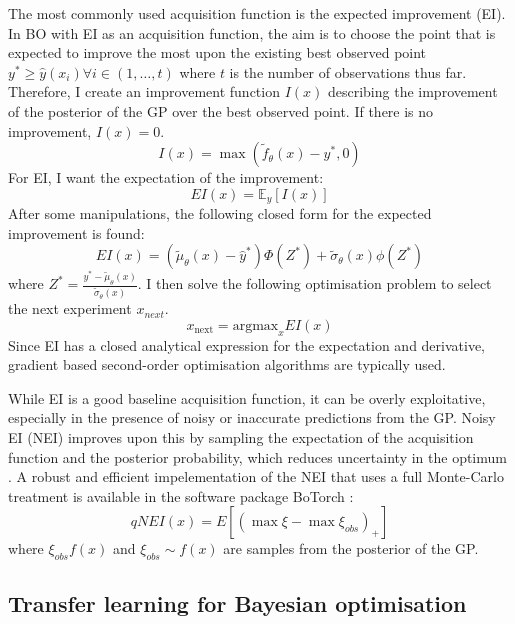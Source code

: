 The most commonly used acquisition function is the expected improvement (EI). In BO with EI as an acquisition function, the aim is to choose the point that is expected to improve the most upon the existing best observed point $y^* \geq \hat y(x_i) \forall i \in (1, \dots, t)$  where  $t$ is the number of observations thus far. Therefore, I create an improvement function $I(x)$ describing the improvement of the posterior of the GP over the best observed point. If there is no improvement, $I(x)=0$.
\begin{equation}
    I(x) = \max(\tilde f_{\theta}(x) -y^*, 0)
\end{equation}
For EI, I want the expectation of the improvement:
\begin{equation}
    EI(x) = \mathbb E_{y}[I(x)]
\end{equation}
After some manipulations, the following closed form for the expected improvement is found:
\begin{equation}
    EI(x) =(\tilde \mu_{\theta}(x)-\hat y^*)\Phi(Z^*) + \tilde \sigma_{\theta}(x) \phi(Z^*)
\end{equation}
where $Z^*= \frac{y^*-\tilde\mu_{\theta}(x)}{\tilde \sigma_{\theta}(x)}$.  I then solve the following optimisation problem to select the next experiment $x_{next}$.
\begin{equation}
    x_{\text{next}} = \text{argmax}_{x} EI(x)
\end{equation}
Since EI has a closed analytical expression for the expectation and derivative, gradient based second-order optimisation algorithms are typically used. 

While EI is a good baseline acquisition function, it can be overly exploitative, especially in the presence of noisy or inaccurate predictions from the GP.  Noisy EI (NEI) improves upon this by sampling the expectation of the acquisition function and the posterior probability, which reduces uncertainty in the optimum \cite{Letham2019}. A robust and efficient impelementation of the NEI that uses a full Monte-Carlo treatment is available in the software package BoTorch \cite{Balandat2020}:
\begin{equation}
qNEI(x)= E[(\max \xi  - \max \xi_{obs} )_+]
\end{equation}
where $\xi_{obs} f(x)$ and $\xi_{obs}\sim f(x)$ are samples from the posterior of the GP.

\subsection{Transfer learning for Bayesian optimisation}

